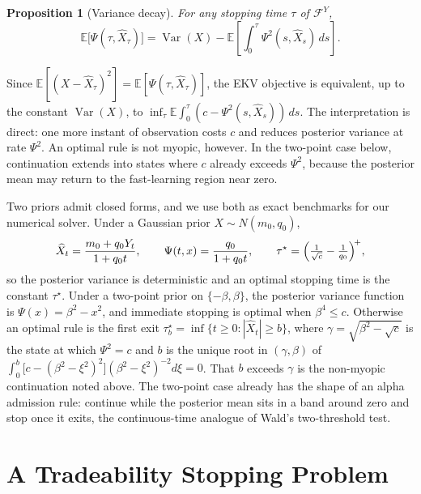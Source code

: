\documentclass[11pt]{article}
\newtheorem{proposition}{Proposition}
\begin{document}
\begin{proposition}[Variance decay]
For any stopping time $\tau$ of $\mathcal F^Y$,
\begin{equation}
    \mathbb E\bigl[\Psi(\tau,\widehat X_\tau)\bigr]
    =
    \operatorname{Var}(X)
    -
    \mathbb E\left[\int_0^\tau \Psi^2(s,\widehat X_s)\,ds\right].
    \label{eq:variance_decay_identity}
\end{equation}
\end{proposition}

\noindent
Since $\mathbb E[(X-\widehat X_\tau)^2]=\mathbb E[\Psi(\tau,\widehat X_\tau)]$, the EKV
objective is equivalent, up to the constant $\operatorname{Var}(X)$, to
$\inf_\tau\mathbb E\int_0^\tau(c-\Psi^2(s,\widehat X_s))\,ds$.  The interpretation is
direct: one more instant of observation costs $c$ and reduces posterior variance at
rate $\Psi^2$.  An optimal rule is not myopic, however.  In the two-point case below,
continuation extends into states where $c$ already exceeds $\Psi^2$, because the
posterior mean may return to the fast-learning region near zero.

Two priors admit closed forms, and we use both as exact benchmarks for our numerical
solver.  Under a Gaussian prior $X\sim N(m_0,q_0)$,
\begin{equation}
    \widehat X_t=\frac{m_0+q_0Y_t}{1+q_0t},
    \qquad
    \Psi(t,x)=\frac{q_0}{1+q_0t},
    \qquad
    \tau^\star=\Bigl(\tfrac{1}{\sqrt c}-\tfrac{1}{q_0}\Bigr)^{\!+},
    \label{eq:gaussian_benchmark}
\end{equation}
so the posterior variance is deterministic and an optimal stopping time is the
constant $\tau^\star$.  Under a two-point prior on $\{-\beta,\beta\}$, the posterior
variance function is $\Psi(x)=\beta^2-x^2$, and immediate stopping is optimal when
$\beta^4\le c$.  Otherwise an optimal rule is the first exit
$\tau_b^\star=\inf\{t\ge0:|\widehat X_t|\ge b\}$, where $\gamma=\sqrt{\beta^2-\sqrt c}$
is the state at which $\Psi^2=c$ and $b$ is the unique root in $(\gamma,\beta)$ of
$\int_0^b\bigl[c-(\beta^2-\xi^2)^2\bigr](\beta^2-\xi^2)^{-2}d\xi=0$.  That $b$ exceeds
$\gamma$ is the non-myopic continuation noted above.  The two-point
case already has the shape of an alpha admission rule: continue while the posterior
mean sits in a band around zero and stop once it exits, the continuous-time analogue
of Wald's two-threshold test.

\section{A Tradeability Stopping Problem}
\label{sec:tradeability}
\end{document}

